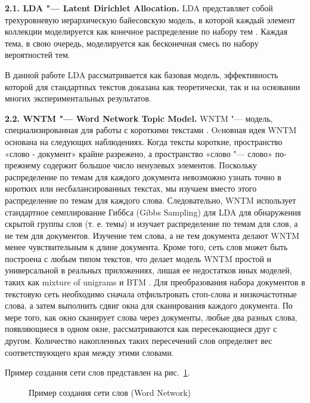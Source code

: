 \textbf{2.1. LDA "--- Latent Dirichlet Allocation.} LDA представляет собой трехуровневую иерархическую байесовскую модель, в которой каждый элемент коллекции моделируется как конечное распределение по набору тем \cite{MichaelJohnDavidAndrew}. Каждая тема, в свою очередь, моделируется как бесконечная смесь по набору вероятностей тем.

В данной работе LDA рассматривается как базовая модель, эффективность которой для стандартных текстов доказана как теоретически, так и на основании многих экспериментальных результатов.

\textbf{2.2. WNTM "--- Word Network Topic Model.} WNTM "--- модель, специализированная для работы с короткими текстами \cite{KeYuanJichang}. Ocновная идея WNTM основана на следующих наблюдениях. Когда тексты короткие, пространство «слово - документ» крайне разрежено, а пространство «слово "--- слово» по-прежнему содержит большое число ненулевых элементов. Поскольку распределение по темам для каждого документа невозможно узнать точно в коротких или несбалансированных текстах, мы изучаем вместо этого распределение по темам для каждого слова. Следовательно, WNTM использует стандартное семплирование Гиббса (Gibbs Sampling) для LDA для обнаружения скрытой группы слов (т. е. темы) и изучает распределение по темам для слов, а не тем для документов. Изучение тем слова, а не тем документа делают WNTM менее чувствительным к длине документа. Кроме того, сеть слов может быть построена с любым типом текстов, что делает модель WNTM простой и универсальной в реальных приложениях, лишая ее недостатков иных моделей, таких как mixture of unigrams \cite{ThrunMitchellNigam} и BTM \cite{YanyanJiafengXueqi}. Для преобразования набора документов в текстовую сеть необходимо сначала отфильтровать стоп-слова и низкочастотные слова, а затем выполнить сдвиг окна для сканирования каждого документа. По мере того, как окно сканирует слова через документы, любые два разных слова, появляющиеся в одном окне, рассматриваются как пересекающиеся друг с другом. Количество накопленных таких пересечений слов определяет вес соответствующего края между этими словами.

Пример создания сети слов представлен на рис.~\cref{fig:wordNetworkExample}.

\begin{figure}[ht]
	\caption{Пример создания сети слов (Word Network) \cite{KeYuanJichang}}\label{fig:wordNetworkExample}
\end{figure}

